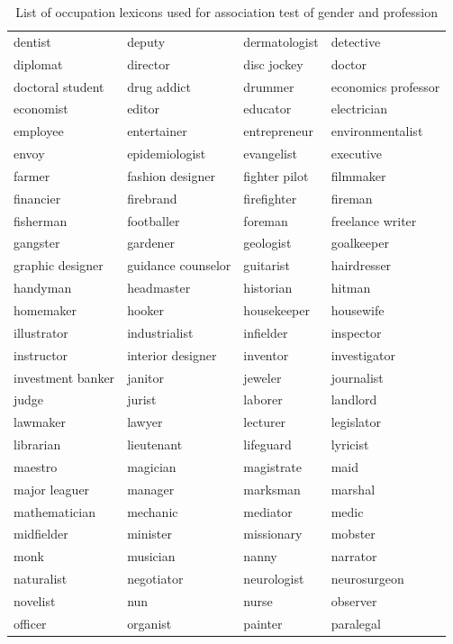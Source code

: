 \documentclass[11pt]{article}
\begin{document}
\begin{table}[t]
\begin{adjustbox}{height=4.2in}
\begin{tabular}{l l l l}
        dentist & deputy & dermatologist & detective \\
        diplomat & director & disc jockey & doctor \\
        doctoral student & drug addict & drummer & economics professor \\
        economist & editor & educator & electrician \\
        employee & entertainer & entrepreneur & environmentalist \\
        envoy & epidemiologist & evangelist & executive \\
        farmer & fashion designer & fighter pilot & filmmaker \\
        financier & firebrand & firefighter & fireman \\
        fisherman & footballer & foreman & freelance writer \\
        gangster & gardener & geologist & goalkeeper \\
        graphic designer & guidance counselor & guitarist & hairdresser \\
        handyman & headmaster & historian & hitman \\
        homemaker & hooker & housekeeper & housewife \\
        illustrator & industrialist & infielder & inspector \\
        instructor & interior designer & inventor & investigator \\
        investment banker & janitor & jeweler & journalist \\
        judge & jurist & laborer & landlord \\
        lawmaker & lawyer & lecturer & legislator \\
        librarian & lieutenant & lifeguard & lyricist \\
        maestro & magician & magistrate & maid \\
        major leaguer & manager & marksman & marshal \\
        mathematician & mechanic & mediator & medic \\
        midfielder & minister & missionary & mobster \\
        monk & musician & nanny & narrator \\
        naturalist & negotiator & neurologist & neurosurgeon \\
        novelist & nun & nurse & observer \\
        officer & organist & painter & paralegal \\
        
    \bottomrule
    \end{tabular}
    \end{adjustbox}
    \caption{List of occupation lexicons used for association test of gender and profession}
    \label{tab:occ1}
\end{table}
\end{document}
